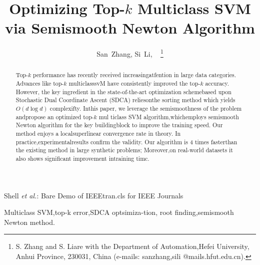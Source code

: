 \documentclass[journal]{IEEEtran}
\begin{document}
\title{Optimizing Top-$k$ Multiclass SVM via Semismooth Newton Algorithm}

\author{San~Zhang, Si~Li, ~
\thanks{S. Zhang and S. Liare with the Department of Automation,Hefei University, Anhui Province, 230031, China (e-mails: {sanzhang,sili} @mails.hfut.edu.cn).}}

%
{Shell \MakeLowercase{\textit{et al.}}: Bare Demo of IEEEtran.cls for IEEE Journals}

\maketitle


\begin{abstract}
Top-$k$ performance has recently received increasingatfention in large data categories. Advances like top-$k$ multiclasssvM have consistently improved the top-$k$ accuracy. However, the key ingredient in the state-of-the-art optimization schemebased upon Stochastic Dual Coordinate Ascent (SDCA) reliesonthe sorting method which yields $O(d\log{d})$ complexifty. Inthis paper, we leverage the semismoothness of the problem andpropose an optimized top-$k$ mul ticlass SVM algorithm,whichemploys semismooth Newton algorithm for the key buildingblock to improve the training speed. Our method enjoys a localsuperlinear convergence rate in theory. In practice,experimentalresults confirm the validity. Our algorithm is 4 times fasterthan the existing method in large synthetic problems; Moreover,on real-world datasets it also shows significant improvement intraining timc.
\end{abstract}

\begin{IEEEkeywords}
Multiclass SVM,top-k error,SDCA optsimiza-tion, root finding,semismooth Newton method.
\end{IEEEkeywords}

\IEEEpeerreviewmaketitle
\end{document}
